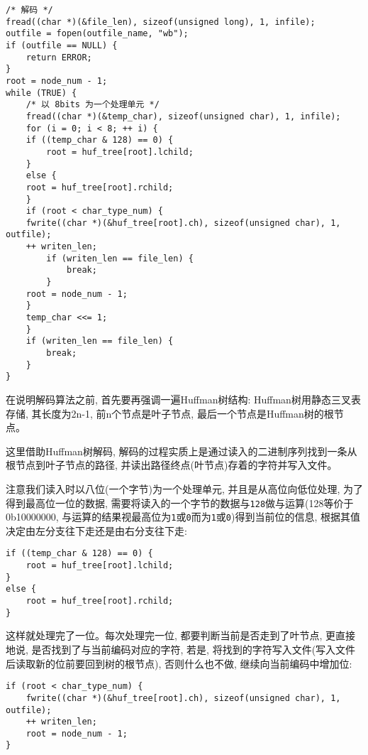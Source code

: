 \documentclass[a4paper]{ctexart}
\begin{document}
{\setmainfont{Courier New Bold}              
\begin{lstlisting}
/* 解码 */
fread((char *)(&file_len), sizeof(unsigned long), 1, infile);
outfile = fopen(outfile_name, "wb");
if (outfile == NULL) {
    return ERROR;
}
root = node_num - 1;
while (TRUE) {
    /* 以 8bits 为一个处理单元 */
    fread((char *)(&temp_char), sizeof(unsigned char), 1, infile);
    for (i = 0; i < 8; ++ i) {
    if ((temp_char & 128) == 0) {
        root = huf_tree[root].lchild;
    }
    else {
    root = huf_tree[root].rchild;
    }
    if (root < char_type_num) {
    fwrite((char *)(&huf_tree[root].ch), sizeof(unsigned char), 1, outfile);
    ++ writen_len;
        if (writen_len == file_len) {
            break;
        }
    root = node_num - 1;
    }
    temp_char <<= 1;
    }
    if (writen_len == file_len) {
        break;
    }
}
\end{lstlisting}}

在说明解码算法之前, 首先要再强调一遍Huffman树结构: Huffman树用静态三叉表存储, 其长度为2n-1, 前n个节点是叶子节点, 最后一个节点是Huffman树的根节点。

这里借助Huffman树解码, 解码的过程实质上是通过读入的二进制序列找到一条从根节点到叶子节点的路径,
并读出路径终点(叶节点)存着的字符并写入文件。

注意我们读入时以八位(一个字节)为一个处理单元, 并且是从高位向低位处理, 为了得到最高位一位的数据,
需要将读入的一个字节的数据与\texttt{128}做与运算(128等价于0b10000000, 与运算的结果视最高位为\texttt{1}或\texttt{0}而为\texttt{1}或\texttt{0})得到当前位的信息, 根据其值决定由左分支往下走还是由右分支往下走:

{\setmainfont{Courier New Bold}              
\begin{lstlisting}
if ((temp_char & 128) == 0) {
    root = huf_tree[root].lchild;
}
else {
    root = huf_tree[root].rchild;
}
\end{lstlisting}}

这样就处理完了一位。每次处理完一位, 都要判断当前是否走到了叶节点, 更直接地说, 是否找到了与当前编码对应的字符, 若是, 将找到的字符写入文件(写入文件后读取新的位前要回到树的根节点), 否则什么也不做, 继续向当前编码中增加位:

{\setmainfont{Courier New Bold}              
\begin{lstlisting}
if (root < char_type_num) {
    fwrite((char *)(&huf_tree[root].ch), sizeof(unsigned char), 1, outfile);
    ++ writen_len;
    root = node_num - 1;
}
\end{lstlisting}}
\end{document}
